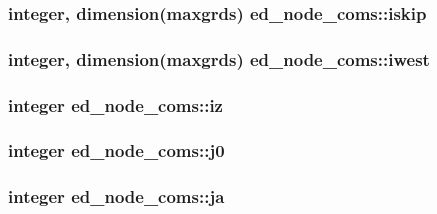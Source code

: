 \subsubsection[{\texorpdfstring{iskip}{iskip}}]{\setlength{\rightskip}{0pt plus 5cm}integer, dimension(maxgrds) ed\+\_\+node\+\_\+coms\+::iskip}\hypertarget{namespaceed__node__coms_aa0b58de3ae40a5b1f807eeb1183579f9}{}\label{namespaceed__node__coms_aa0b58de3ae40a5b1f807eeb1183579f9}
\subsubsection[{\texorpdfstring{iwest}{iwest}}]{\setlength{\rightskip}{0pt plus 5cm}integer, dimension(maxgrds) ed\+\_\+node\+\_\+coms\+::iwest}\hypertarget{namespaceed__node__coms_a799bc57708f0eade1e7c33bfed33deea}{}\label{namespaceed__node__coms_a799bc57708f0eade1e7c33bfed33deea}
\subsubsection[{\texorpdfstring{iz}{iz}}]{\setlength{\rightskip}{0pt plus 5cm}integer ed\+\_\+node\+\_\+coms\+::iz}\hypertarget{namespaceed__node__coms_a29c92ad4b60b88059dac8a8291b4553b}{}\label{namespaceed__node__coms_a29c92ad4b60b88059dac8a8291b4553b}
\subsubsection[{\texorpdfstring{j0}{j0}}]{\setlength{\rightskip}{0pt plus 5cm}integer ed\+\_\+node\+\_\+coms\+::j0}\hypertarget{namespaceed__node__coms_a1767484e9dd38f3c6b443cd2202283a0}{}\label{namespaceed__node__coms_a1767484e9dd38f3c6b443cd2202283a0}
\subsubsection[{\texorpdfstring{ja}{ja}}]{\setlength{\rightskip}{0pt plus 5cm}integer ed\+\_\+node\+\_\+coms\+::ja}\hypertarget{namespaceed__node__coms_a49471084e0370630b07db902c46c2ea8}{}\label{namespaceed__node__coms_a49471084e0370630b07db902c46c2ea8}
